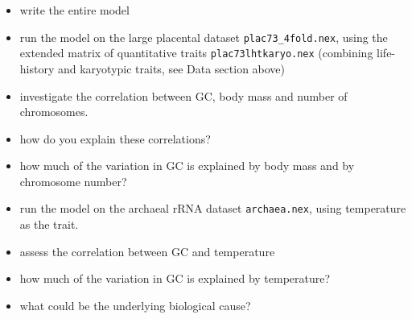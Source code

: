 \documentclass[usletter]{article}
\newcommand{\cmd}[1]{\texttt{#1}}
\begin{document}
\begin{itemize}
\item
write the entire model
\item
run the model on the large placental dataset \cmd{plac73\_4fold.nex},
using the extended matrix of quantitative traits \cmd{plac73lhtkaryo.nex} (combining life-history and karyotypic traits, see Data section above)
\item
investigate the correlation between GC, body mass and number of chromosomes. 
\item
how do you explain these correlations?
\item
how much of the variation in GC is explained by body mass and by chromosome number?
\item
run the model on the archaeal rRNA dataset \cmd{archaea.nex}, using temperature as the trait.
\item
assess the correlation between GC and temperature
\item
how much of the variation in GC is explained by temperature?
\item
what could be the underlying biological cause?
\end{itemize}





\end{document}
